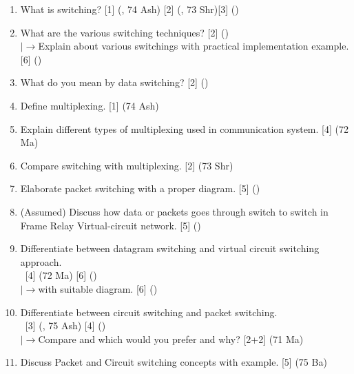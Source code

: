 \documentclass[12pt]{article}
\newcommand{\lb}{\\$\left|\rightarrow\right.$}
\newcommand{\enter}{\\\textcolor{white}{1}}
\begin{document}
		\begin{enumerate}[noitemsep, topsep=0pt]
			\item What is switching? \hfill [1] (, 74 Ash) [2] (, 73 Shr)[3] ()
			
			\item What are the various switching techniques? \hfill [2] ()
			\lb Explain about various switchings with practical implementation example. \hfill [6] ()
			
			\item What do you mean by data switching? \hfill [2] ()
			
			\item Define multiplexing. \hfill [1] (74 Ash)
			
			\item Explain different types of multiplexing used in communication system. \hfill [4] (72 Ma)
			
			\item Compare switching with multiplexing. \hfill [2] (73 Shr)

			\item Elaborate packet switching with a proper diagram. \hfill [5] ()	
			
			\item (Assumed) Discuss how data or packets goes through switch to switch in Frame Relay Virtual-circuit network. \hspace{12.6cm} [5] ()
			
			\item Differentiate between datagram switching and virtual circuit switching approach. 
			\enter \hfill [4] (72 Ma) [6] ()
			\lb with suitable diagram. \hfill [6] ()
			
			\item Differentiate between circuit switching and packet switching. 
			\enter\hfill [3] (, 75 Ash) [4] ()
			\lb Compare and which would you prefer and why? \hfill [2+2] (71 Ma)
			
			\item Discuss Packet and Circuit switching concepts with example. \hfill [5] (75 Ba)
		\end{enumerate}
\end{document}
